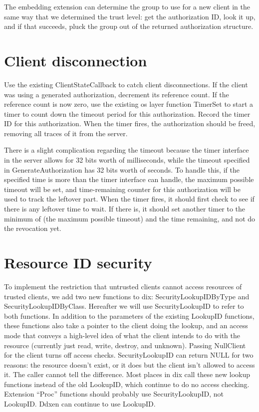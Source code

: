 The embedding extension can determine the group to use for a new
client in the same way that we determined the trust level: get the
authorization ID, look it up, and if that succeeds, pluck the group
out of the returned authorization structure.

\section{Client disconnection}

Use the existing ClientStateCallback to catch client disconnections.
If the client was using a generated authorization, decrement its
reference count.  If the reference count is now zero, use the existing
os layer function TimerSet to start a timer to count down the timeout
period for this authorization.  Record the timer ID for this
authorization.  When the timer fires, the authorization should be
freed, removing all traces of it from the server.

There is a slight complication regarding the timeout because the timer
interface in the server allows for 32 bits worth of milliseconds,
while the timeout specified in GenerateAuthorization has 32 bits worth
of seconds.  To handle this, if the specified time is more than the
timer interface can handle, the maximum possible timeout will be set,
and time-remaining counter for this authorization will be used to
track the leftover part.  When the timer fires, it should first check
to see if there is any leftover time to wait.  If there is, it should
set another timer to the minimum of (the maximum possible timeout) and
the time remaining, and not do the revocation yet.

\section{Resource ID security}

To implement the restriction that untrusted clients cannot access
resources of trusted clients, we add two new functions to dix:
SecurityLookupIDByType and SecurityLookupIDByClass.  Hereafter we will
use SecurityLookupID to refer to both functions.  In addition to the
parameters of the existing LookupID functions, these functions also
take a pointer to the client doing the lookup, and an access mode that
conveys a high-level idea of what the client intends to do with the
resource (currently just read, write, destroy, and unknown).  Passing
NullClient for the client turns off access checks.  SecurityLookupID
can return NULL for two reasons: the resource doesn't exist, or it
does but the client isn't allowed to access it.  The caller cannot
tell the difference.  Most places in dix call these new lookup
functions instead of the old LookupID, which continue to do no access
checking.  Extension ``Proc'' functions should probably use
SecurityLookupID, not LookupID.  Ddxen can continue to use LookupID.

